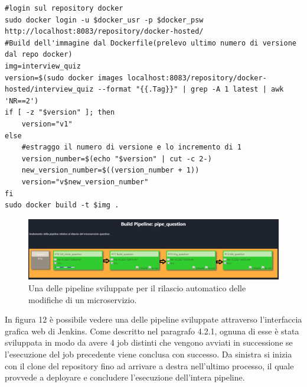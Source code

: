 \documentclass[a4paper,12pt]{report}
\begin{document}
\begin{lstlisting}[caption={\\\textit{Frammento di codice relativo al versionamento e alla build dell'immagine.}}]
#login sul repository docker
sudo docker login -u $docker_usr -p $docker_psw http://localhost:8083/repository/docker-hosted/
#Build dell'immagine dal Dockerfile(prelevo ultimo numero di versione dal repo docker)
img=interview_quiz
version=$(sudo docker images localhost:8083/repository/docker-hosted/interview_quiz --format "{{.Tag}}" | grep -A 1 latest | awk 'NR==2')
if [ -z "$version" ]; then
	version="v1"
else
    #estraggo il numero di versione e lo incremento di 1
    version_number=$(echo "$version" | cut -c 2-)
    new_version_number=$((version_number + 1))
    version="v$new_version_number"
fi
sudo docker build -t $img .
\end{lstlisting} 
\begin{figure}[h]
	\includegraphics[width=1.0\textwidth]{pipeline}
    \caption{Una delle pipeline sviluppate per il rilascio automatico delle modifiche di un microservizio.}
    \label{fig:pipeline}
\end{figure}

In figura 12 è possibile vedere una delle pipeline sviluppate attraverso l'interfaccia grafica web di Jenkins. Come descritto nel paragrafo 4.2.1, ognuna di esse è stata sviluppata in modo da avere 4 job distinti che vengono avviati in successione se l'esecuzione del job precedente viene conclusa con successo. Da sinistra si inizia con il clone del repository fino ad arrivare a destra nell'ultimo processo, il quale provvede a deployare e concludere l'esecuzione dell'intera pipeline.\\
\end{document}
